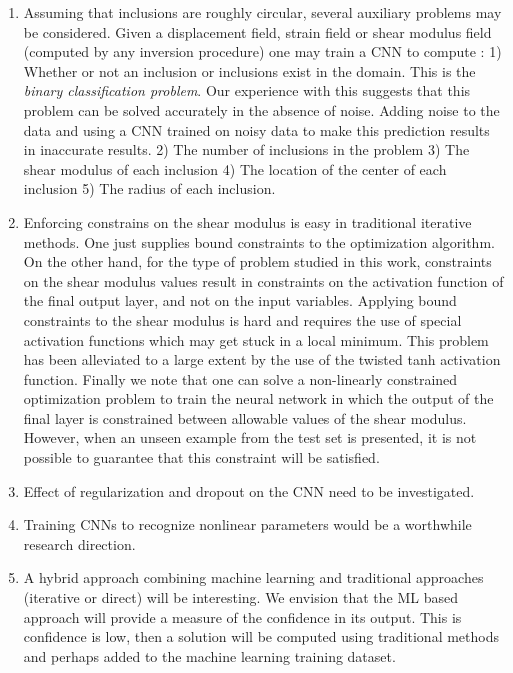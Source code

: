 \documentclass[12pt]{article}
\begin{document}
\begin{enumerate}
\item{Assuming that inclusions are roughly circular, several auxiliary problems may be considered. Given a displacement field, strain field or shear modulus field (computed by any inversion procedure) one may train a CNN to compute : 1) Whether or not an inclusion or inclusions exist  in the domain. This is the \textit{binary classification problem}. Our experience with this suggests that this problem can be solved accurately in the absence of noise.  Adding noise to the data and using a CNN trained on noisy data to make this prediction results in inaccurate results. 2) The number of inclusions in the problem 3) The shear modulus of each inclusion 4) The location of the center of each inclusion 5) The radius of each inclusion.}
\item{Enforcing constrains on the shear modulus is easy in traditional iterative methods. One just supplies bound constraints to the optimization algorithm. On the other hand, for the type of problem studied in this work, constraints on the shear modulus values result in constraints on the activation function of the final output layer, and not on the input variables. Applying bound constraints to the shear modulus is hard and requires the use of special activation functions which may get stuck in a local minimum. This problem has been alleviated to a large extent by the use of the twisted tanh activation function. Finally we note that one can solve a non-linearly constrained optimization problem to train the neural network in which the output of the final layer is constrained between allowable values of the shear modulus. However, when an unseen example from the test set is presented, it is not possible to guarantee that this constraint will be satisfied.}
\item{Effect of regularization and dropout on the CNN need to be investigated.}
\item{Training CNNs to recognize nonlinear parameters would be a worthwhile research direction.}
\item{A hybrid approach combining machine learning and traditional approaches (iterative or direct) will be interesting. We envision that the ML based approach will provide a measure of the confidence in its output. This is confidence is low, then a solution will be computed using traditional methods and perhaps added to the machine learning training dataset. }

\end{enumerate}
\end{document}
